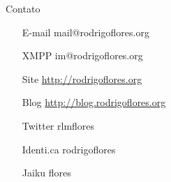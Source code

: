 \documentclass{beamer}
\begin{document}
\begin{frame}
    \begin{block}{Contato}     
    \begin{itemize}
            \centering
            \item[E-mail] mail@rodrigoflores.org 
            \item[XMPP]  im@rodrigoflores.org        
            \item[Site]  \url{http://rodrigoflores.org}
            \item[Blog]  \url{http://blog.rodrigoflores.org}        
            \item[Twitter] rlmflores 
            \item[Identi.ca] rodrigoflores        
            \item[Jaiku] flores        
        \end{itemize}
    \end{block}
\end{frame}
\end{document}
